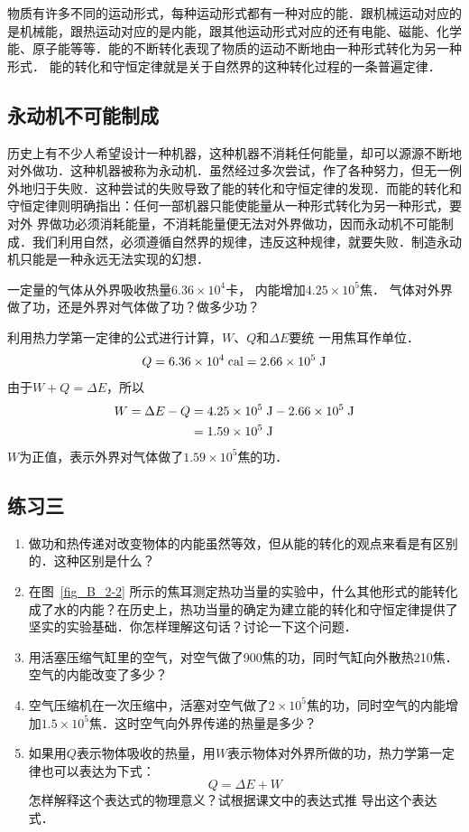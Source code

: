 物质有许多不同的运动形式，每种运动形式都有一种对应的能．跟机械运动对应的是机械能，跟热运动对应的是内能，跟其他运动形式对应的还有电能、磁能、化学能、原子能等等．能的不断转化表现了物质的运动不断地由一种形式转化为另一种形式．
能的转化和守恒定律就是关于自然界的这种转化过程的一条普遍定律．

\subsection{永动机不可能制成} 
历史上有不少人希望设计一种机器，这种机器不消耗任何能量，却可以源源不断地对外做功．这种机器被称为永动机．虽然经过多次尝试，作了各种努力，但无一例外地归于失败．这种尝试的失败导致了能的转化和守恒定律的发现．而能的转化和守恒定律则明确指出：任何一部机器只能使能量从一种形式转化为另一种形式，要对外
界做功必须消耗能量，不消耗能量便无法对外界做功，因而永动机不可能制成．我们利用自然，必须遵循自然界的规律，违反这种规律，就要失败．制造永动机只能是一种永远无法实现的幻想．

\begin{example}
    一定量的气体从外界吸收热量$6.36\times 10^4$卡，
内能增加$4.25\times 10^5$焦．
气体对外界做了功，还是外界对气体做了功？做多少功？    
\end{example}

\begin{solution}
利用热力学第一定律的公式进行计算，$W$、$Q$和$\Delta E$要统
一用焦耳作单位．
\[Q=6.36\times 10^{4} \;\text{cal} =2.66\times 10^5 \;\text{J} \]
由于$W+Q=\Delta E$，所以
\[\begin{split}
W=\Delta E-Q&=4.25 \times 10^5 \;\text{J} -2.66\times 10^5 \;\text{J} \\
&=1.59\times 10^5 \;\text{J}
\end{split} \]
$W$为正值，表示外界对气体做了$1.59\times 10^5$焦的功．
\end{solution}

\subsection*{练习三}
\begin{enumerate}
\item 做功和热传递对改变物体的内能虽然等效，但从能的转化的观点来看是有区别的．这种区别是什么？
\item 在图~\ref{fig_B_2-2} 所示的焦耳测定热功当量的实验中，什么其他形式的能转化成了水的内能？在历史上，热功当量的确定为建立能的转化和守恒定律提供了坚实的实验基础．你怎样理解这句话？讨论一下这个问题．
\item 用活塞压缩气缸里的空气，对空气做了900焦的功，同时气缸向外散热210焦．空气的内能改变了多少？
\item 空气压缩机在一次压缩中，活塞对空气做了$2\times 10^5$焦的功，同时空气的内能增加$1.5\times 10^5$焦．这时空气向外界传递的热量是多少？
\item 如果用$Q$表示物体吸收的热量，用$W$表示物体对外界所做的功，热力学第一定律也可以表达为下式：
\[Q=\Delta E+W\]
怎样解释这个表达式的物理意义？试根据课文中的表达式推
导出这个表达式．
\end{enumerate}

